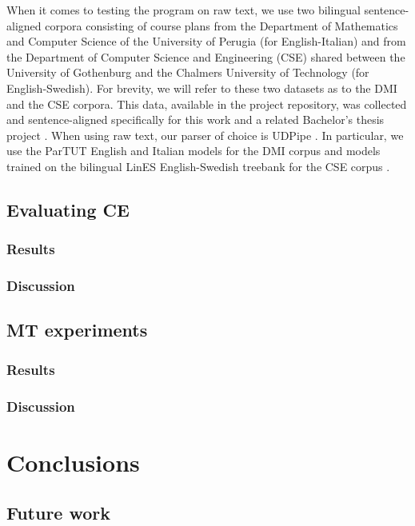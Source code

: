 \documentclass[11pt]{article}
\begin{document}
When it comes to testing the program on raw text, we use two bilingual sentence-aligned corpora consisting of course plans from the Department of Mathematics and Computer Science of the University of Perugia (for English-Italian) and from the Department of Computer Science and Engineering (CSE) shared between the University of Gothenburg and the Chalmers University of Technology (for English-Swedish). For brevity, we will refer to these two datasets as to the DMI and the CSE corpora.
This data, available in the project repository, was collected and sentence-aligned specifically for this work and a related Bachelor's thesis project \cite{TODO:}.
When using raw text, our parser of choice is UDPipe \cite{TODO:}. 
In particular, we use the ParTUT English and Italian models for the DMI corpus and models trained on the bilingual LinES English-Swedish treebank for the CSE corpus \cite{TODO:}.

\subsection{Evaluating CE} %
\subsubsection{Results}
\subsubsection{Discussion}

\subsection{MT experiments}
\subsubsection{Results}
\subsubsection{Discussion}

\section{Conclusions} \label{conclusions}
\subsection{Future work}

%
%
\end{document}
